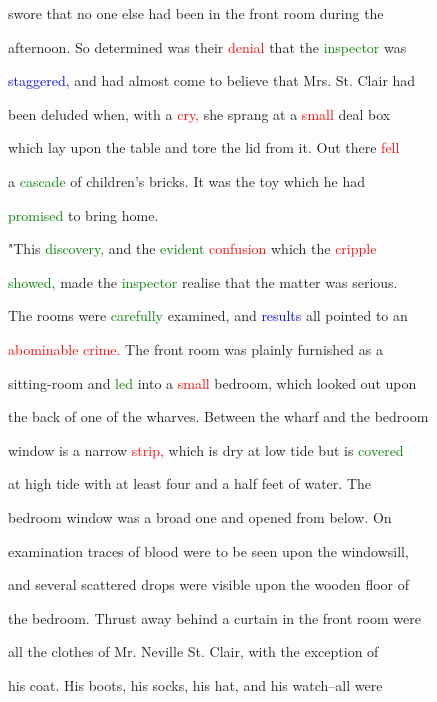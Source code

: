  swore that no one else had been in the front room during the

 afternoon. So determined was their \textcolor{red}{denial} that the \textcolor{green}{inspector} was

 \textcolor{blue}{staggered,} and had almost come to believe that Mrs. St. Clair had

 been deluded when, with a \textcolor{red}{cry,} she sprang at a \textcolor{red}{small} \textcolor{BurntOrange}{deal} box

 which lay upon the table and tore the lid from it. Out there \textcolor{red}{fell}

 a \textcolor{green}{cascade} of children's bricks. It was the toy which he had

 \textcolor{green}{promised} to bring home.



 "This \textcolor{green}{discovery,} and the \textcolor{green}{evident} \textcolor{red}{confusion} which the \textcolor{red}{cripple}

 \textcolor{green}{showed,} made the \textcolor{green}{inspector} realise that the matter was serious.

 The rooms were \textcolor{green}{carefully} examined, and \textcolor{blue}{results} all pointed to an

 \textcolor{red}{abominable} \textcolor{red}{crime.} The front room was plainly furnished as a

 sitting-room and \textcolor{green}{led} into a \textcolor{red}{small} bedroom, which looked out upon

 the back of one of the wharves. Between the wharf and the bedroom

 window is a narrow \textcolor{red}{strip,} which is dry at low tide but is \textcolor{green}{covered}

 at high tide with at least four and a half feet of water. The

 bedroom window was a broad one and opened from below. On

 \textcolor{BurntOrange}{examination} traces of blood were to be seen upon the windowsill,

 and several scattered drops were visible upon the wooden floor of

 the bedroom. Thrust away behind a curtain in the front room were

 all the clothes of Mr. Neville St. Clair, with the exception of

 his coat. His boots, his socks, his hat, and his watch--all were

